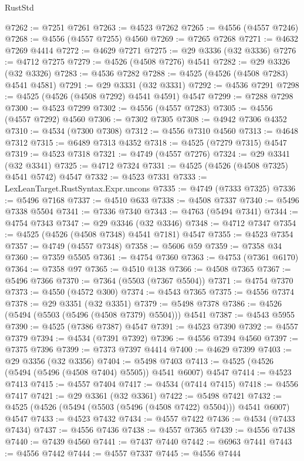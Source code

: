 \begin{lexlean}{RustStd}
\begin{coremodule}
{\begin{coremodule}
{{{{{{{{{{{{{{{{{{{{{{{{{{{{{{{{{{{{{{{{{{{{{{{{{{{{{{{@7262 := @7251 @7261
@7263 := @4523 @7262
@7265 := @4556 (@4557 @7246)
@7268 := @4556 (@4557 @7255) @4560
@7269 := @7265 @7268
@7271 := @4632 @7269 @4414
@7272 := @4629 @7271
@7275 := @29 @3336 (@32 @3336)
@7276 := @4712 @7275
@7279 := @4526 (@4508 @7276) @4541
@7282 := @29 @3326 (@32 @3326)
@7283 := @4536 @7282
@7288 := @4525 (@4526 (@4508 @7283) @4541 @4581)
@7291 := @29 @3331 (@32 @3331)
@7292 := @4536 @7291
@7298 := @4525 (@4526 (@4508 @7292) @4541 @4591) @4547
@7299 := @7288 @7298
@7300 := @4523 @7299
@7302 := @4556 (@4557 @7283)
@7305 := @4556 (@4557 @7292) @4560
@7306 := @7302 @7305
@7308 := @4942 @7306 @4352
@7310 := @4534 (@7300 @7308)
@7312 := @4556 @7310 @4560
@7313 := @4648 @7312
@7315 := @6489 @7313 @4352
@7318 := @4525 (@7279 @7315) @4547
@7319 := @4523 @7318
@7321 := @4749 (@4557 @7276)
@7324 := @29 @3341 (@32 @3341)
@7325 := @4712 @7324
@7331 := @4525 (@4526 (@4508 @7325) @4541 @5742) @4547
@7332 := @4523 @7331
@7333 := LexLeanTarget.RustSyntax.Expr.uncons
@7335 := @4749 (@7333 @7325)
@7336 := @5496 @7168
@7337 := @4510 @633
@7338 := @4508 @7337
@7340 := @5496 @7338 @5504
@7341 := @7336 @7340
@7343 := @4763 (@5494 @7341)
@7344 := @4754 @7343
@7347 := @29 @3346 (@32 @3346)
@7348 := @4712 @7347
@7354 := @4525 (@4526 (@4508 @7348) @4541 @7181) @4547
@7355 := @4523 @7354
@7357 := @4749 (@4557 @7348)
@7358 := @5606 @59
@7359 := @7358 @34
@7360 := @7359 @5505
@7361 := @4754 @7360
@7363 := @4753 (@7361 @6170)
@7364 := @7358 @97
@7365 := @4510 @138
@7366 := @4508 @7365
@7367 := @5496 @7366
@7370 := @7364 (@5503 (@7367 @5504))
@7371 := @4754 @7370
@7373 := @4550 (@4572 @300)
@7374 := @4543 @7365
@7375 := @4556 @7374
@7378 := @29 @3351 (@32 @3351)
@7379 := @5498 @7378
@7386 := @4526 (@5494 (@5503 (@5496 (@4508 @7379) @5504))) @4541
@7387 := @4543 @5955
@7390 := @4525 (@7386 @7387) @4547
@7391 := @4523 @7390
@7392 := @4557 @7379
@7394 := @4534 (@7391 @7392)
@7396 := @4556 @7394 @4560
@7397 := @7375 @7396
@7399 := @7373 @7397 @4414
@7400 := @4629 @7399
@7403 := @29 @3356 (@32 @3356)
@7404 := @5498 @7403
@7413 := @4525 (@4526 (@5494 (@5496 (@4508 @7404) @5505)) @4541 @6007) @4547
@7414 := @4523 @7413
@7415 := @4557 @7404
@7417 := @4534 (@7414 @7415)
@7418 := @4556 @7417
@7421 := @29 @3361 (@32 @3361)
@7422 := @5498 @7421
@7432 := @4525 (@4526 (@5494 (@5503 (@5496 (@4508 @7422) @5504))) @4541 @6007) @4547
@7433 := @4523 @7432
@7434 := @4557 @7422
@7436 := @4534 (@7433 @7434)
@7437 := @4556 @7436
@7438 := @4557 @7365
@7439 := @4556 @7438
@7440 := @7439 @4560
@7441 := @7437 @7440
@7442 := @6963 @7441
@7443 := @4556 @7442
@7444 := @4557 @7337
@7445 := @4556 @7444
}}}}}}}}}}}}}}}}}}}}}}}}}}}}}}}}}}}}}}}}}}}}}}}}}}}}}}}
\end{coremodule}}
\end{coremodule}
\end{lexlean}

